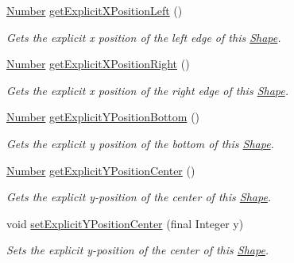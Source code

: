 \begin{DoxyCompactItemize}
\hyperlink{interfacecom_1_1aarrelaakso_1_1drawl_1_1_number}{Number} \hyperlink{classcom_1_1aarrelaakso_1_1drawl_1_1_shape_abd7f6c77e2c62100bb72d8ad3085e288}{get\+Explicit\+X\+Position\+Left} ()
\begin{DoxyCompactList}\small\item\em Gets the explicit x position of the left edge of this \hyperlink{classcom_1_1aarrelaakso_1_1drawl_1_1_shape}{Shape}. \end{DoxyCompactList}\item 
\hyperlink{interfacecom_1_1aarrelaakso_1_1drawl_1_1_number}{Number} \hyperlink{classcom_1_1aarrelaakso_1_1drawl_1_1_shape_a86920ba43a76d5a02977e5f9ea3509ac}{get\+Explicit\+X\+Position\+Right} ()
\begin{DoxyCompactList}\small\item\em Gets the explicit x position of the right edge of this \hyperlink{classcom_1_1aarrelaakso_1_1drawl_1_1_shape}{Shape}. \end{DoxyCompactList}\item 
\hyperlink{interfacecom_1_1aarrelaakso_1_1drawl_1_1_number}{Number} \hyperlink{classcom_1_1aarrelaakso_1_1drawl_1_1_shape_a28b8e03381be6afdc7c5c8da48c80afe}{get\+Explicit\+Y\+Position\+Bottom} ()
\begin{DoxyCompactList}\small\item\em Gets the explicit y position of the bottom of this \hyperlink{classcom_1_1aarrelaakso_1_1drawl_1_1_shape}{Shape}. \end{DoxyCompactList}\item 
\hyperlink{interfacecom_1_1aarrelaakso_1_1drawl_1_1_number}{Number} \hyperlink{classcom_1_1aarrelaakso_1_1drawl_1_1_shape_a1e46cc626d5f5e1360d9d35d23cc50ea}{get\+Explicit\+Y\+Position\+Center} ()
\begin{DoxyCompactList}\small\item\em Gets the explicit y-\/position of the center of this \hyperlink{classcom_1_1aarrelaakso_1_1drawl_1_1_shape}{Shape}. \end{DoxyCompactList}\item 
void \hyperlink{classcom_1_1aarrelaakso_1_1drawl_1_1_shape_a93e9e1bdd05f111661660e9de621cd12}{set\+Explicit\+Y\+Position\+Center} (final Integer y)
\begin{DoxyCompactList}\small\item\em Sets the explicit y-\/position of the center of this \hyperlink{classcom_1_1aarrelaakso_1_1drawl_1_1_shape}{Shape}. \end{DoxyCompactList}\item 

\end{DoxyCompactItemize}
